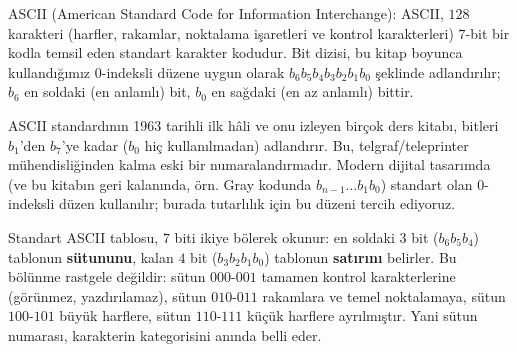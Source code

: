 \begin{tanim}{ASCII (American Standard Code for Information Interchange):}
ASCII, $128$ karakteri (harfler, rakamlar, noktalama işaretleri ve kontrol karakterleri)
$7$-bit bir kodla temsil eden standart karakter kodudur. Bit dizisi, bu kitap boyunca
kullandığımız $0$-indeksli düzene uygun olarak $b_6b_5b_4b_3b_2b_1b_0$ şeklinde
adlandırılır; $b_6$ en soldaki (en anlamlı) bit, $b_0$ en sağdaki (en az anlamlı) bittir.
\end{tanim}

\begin{bilginot}
ASCII standardının 1963 tarihli ilk hâli ve onu izleyen birçok ders kitabı, bitleri
$b_1$'den $b_7$'ye kadar ($b_0$ hiç kullanılmadan) adlandırır. Bu, telgraf/teleprinter
mühendisliğinden kalma eski bir numaralandırmadır. Modern dijital tasarımda (ve bu kitabın
geri kalanında, örn. Gray kodunda $b_{n-1}\ldots b_1b_0$) standart olan $0$-indeksli düzen
kullanılır; burada tutarlılık için bu düzeni tercih ediyoruz.
\end{bilginot}

Standart ASCII tablosu, $7$ biti ikiye bölerek okunur: en soldaki $3$ bit
($b_6b_5b_4$) tablonun \textbf{sütununu}, kalan $4$ bit ($b_3b_2b_1b_0$) tablonun
\textbf{satırını} belirler. Bu bölünme rastgele değildir: sütun $000$-$001$ tamamen
kontrol karakterlerine (görünmez, yazdırılamaz), sütun $010$-$011$ rakamlara ve temel
noktalamaya, sütun $100$-$101$ büyük harflere, sütun $110$-$111$ küçük harflere ayrılmıştır.
Yani sütun numarası, karakterin kategorisini anında belli eder.

